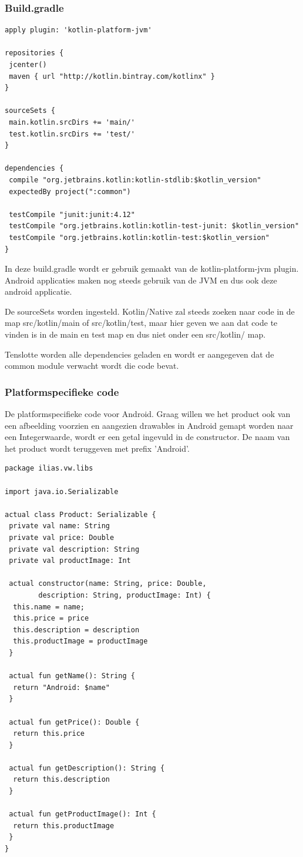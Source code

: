 \subsubsection{Build.gradle}
\begin{lstlisting}
apply plugin: 'kotlin-platform-jvm'

repositories {
 jcenter()
 maven { url "http://kotlin.bintray.com/kotlinx" }
}

sourceSets {
 main.kotlin.srcDirs += 'main/'
 test.kotlin.srcDirs += 'test/'
}

dependencies {
 compile "org.jetbrains.kotlin:kotlin-stdlib:$kotlin_version"
 expectedBy project(":common")

 testCompile "junit:junit:4.12"
 testCompile "org.jetbrains.kotlin:kotlin-test-junit: $kotlin_version"
 testCompile "org.jetbrains.kotlin:kotlin-test:$kotlin_version"
}
\end{lstlisting}

In deze build.gradle wordt er gebruik gemaakt van de kotlin-platform-jvm plugin. Android applicaties maken nog steeds gebruik van de JVM en dus ook deze android applicatie. 

De sourceSets worden ingesteld. Kotlin/Native zal steeds zoeken naar code in de map src/kotlin/main of src/kotlin/test, maar hier geven we aan dat code te vinden is in de main en test map en dus niet onder een src/kotlin/ map.

Tenslotte worden alle dependencies geladen en wordt er aangegeven dat de common module verwacht wordt die code bevat.

\subsubsection{Platformspecifieke code}
De platformspecifieke code voor Android. Graag willen we het product ook van een afbeelding voorzien en aangezien drawables in Android gemapt worden naar een Integerwaarde, wordt er een getal ingevuld in de constructor. De naam van het product wordt teruggeven met prefix 'Android'.
\begin{lstlisting}
package ilias.vw.libs

import java.io.Serializable

actual class Product: Serializable {
 private val name: String
 private val price: Double
 private val description: String
 private val productImage: Int

 actual constructor(name: String, price: Double, 
		description: String, productImage: Int) {
  this.name = name;
  this.price = price
  this.description = description
  this.productImage = productImage
 }

 actual fun getName(): String {
  return "Android: $name"
 }

 actual fun getPrice(): Double {
  return this.price
 }

 actual fun getDescription(): String {
  return this.description
 }

 actual fun getProductImage(): Int {
  return this.productImage
 }
}
\end{lstlisting}

